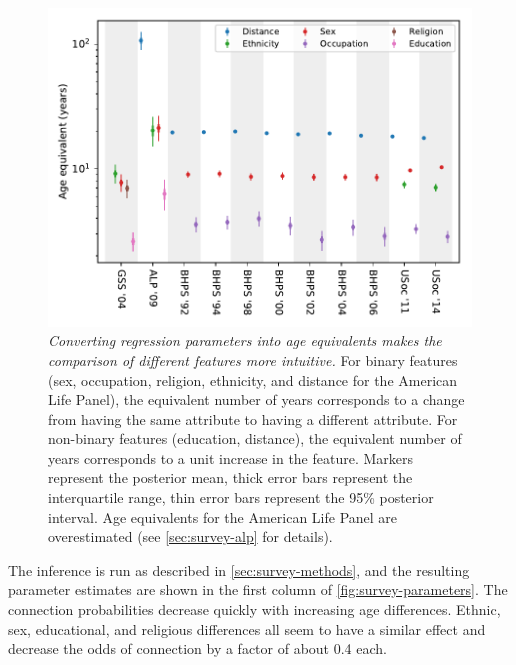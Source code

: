 \documentclass{scrartcl}
\newcommand{\titlecaption}[2]{\caption[#1]{\emph{#1} #2}}
\begin{document}
\begin{figure}
    \includegraphics{survey-age-equivalent}
    \titlecaption{Converting regression parameters into age equivalents makes the comparison of different features more intuitive.}{For binary features (sex, occupation, religion, ethnicity, and distance for the American Life Panel), the equivalent number of years corresponds to a change from having the same attribute to having a different attribute. For non-binary features (education, distance), the equivalent number of years corresponds to a unit increase in the feature. Markers represent the posterior mean, thick error bars represent the interquartile range, thin error bars represent the 95\% posterior interval. Age equivalents for the American Life Panel are overestimated (see \cref{sec:survey-alp} for details).
    \label{fig:survey-age-equivalent}}
\end{figure}

The inference is run as described in \cref{sec:survey-methods}, and the resulting parameter estimates are shown in the first column of \cref{fig:survey-parameters}. The connection probabilities decrease quickly with increasing age differences. Ethnic, sex, educational, and religious differences all seem to have a similar effect and decrease the odds of connection by a factor of about 0.4 each.
\end{document}

